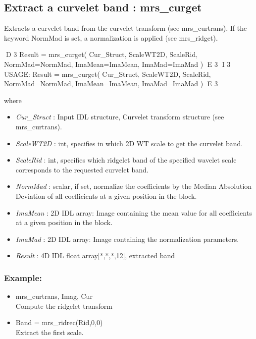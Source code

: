 \subsection{Extract a curvelet band : mrs\_curget}
Extracts a curvelet band from the curvelet transform (see mrs\_curtrans). If the keyword NormMad is set, a normalization is applied (see mrs\_ridget).
 {\bf
\begin{center}
D 3
     Result = mrs\_curget( Cur\_Struct, ScaleWT2D, ScaleRid, NormMad=NormMad, ImaMean=ImaMean, ImaMad=ImaMad )   
E 3
I 3
     USAGE: Result = mrs\_curget( Cur\_Struct, ScaleWT2D, ScaleRid, NormMad=NormMad, ImaMean=ImaMean, ImaMad=ImaMad )   
E 3
\end{center}}
where
\begin{itemize}
\item {\em Cur\_Struct} : Input IDL structure, Curvelet transform structure (see mrs\_curtrans).
\item {\em ScaleWT2D} : int, specifies in which 2D WT scale to get the curvelet band.
\item {\em ScaleRid} : int, specifies which ridgelet band of the specified wavelet scale corresponds to the requested curvelet band. 
\item {\em NormMad} : scalar, if set, normalize the coefficients by the Median Absolution Deviation of all coefficients at a given position in the block.
\item {\em ImaMean} : 2D IDL array: Image containing the mean value for all coefficients at a given position in the block.
\item {\em ImaMad} : 2D IDL array: Image containing the normalization parameters.
\item {\em Result} : 4D IDL float array[*,*,*,12], extracted band
\end{itemize}

\subsubsection*{Example:} 
\begin{itemize}
\item mrs\_curtrans, Imag, Cur   \\
Compute the ridgelet transform
\item Band = mrs\_ridrec(Rid,0,0) \\
Extract the first scale.
\end{itemize}



